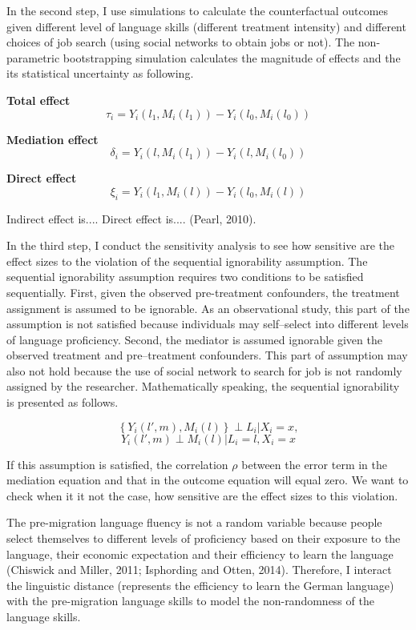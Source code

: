 \documentclass[12pt,a4paper]{article}
\begin{document}
In the second step, I use simulations to calculate the counterfactual outcomes given different level of language skills (different treatment intensity) and different choices of job search (using social networks to obtain jobs or not). The non-parametric bootstrapping simulation calculates the magnitude of effects and the its statistical uncertainty as following.

\textbf{Total effect}
$$\tau_{i} = Y_{i}(l_{1}, M_{i}(l_{1})) - Y_{i}(l_{0}, M_{i}(l_{0}))$$

\textbf{Mediation effect}
$$\delta_{i} = Y_{i}(l, M_{i}(l_{1})) - Y_{i}(l, M_{i}(l_{0}))$$

\textbf{Direct effect}
$$\xi_{i} = Y_{i}(l_{1}, M_{i}(l)) - Y_{i}(l_{0}, M_{i}(l))$$

Indirect effect is.... Direct effect is.... (Pearl, 2010).

In the third step, I conduct the sensitivity analysis to see how sensitive are the effect sizes to the violation of the sequential ignorability assumption. The sequential ignorability assumption requires two conditions to be satisfied sequentially. First, given the observed pre-treatment confounders, the treatment assignment is assumed to be ignorable. As an observational study, this part of the assumption is not satisfied because individuals may self--select into different levels of language proficiency. Second, the mediator is assumed ignorable given the observed treatment and pre--treatment confounders. This part of assumption may also not hold because the use of social network to search for job is not randomly assigned by the researcher. Mathematically speaking, the sequential ignorability is presented as follows.

$$\left \{Y_{i}(l', m), M_{i}(l)\right \} \perp L_{i}|X_{i}=x, $$
$$Y_{i}(l', m) \perp M_{i}(l)|L_{i}=l, X_{i}=x $$

If this assumption is satisfied, the correlation $\rho$ between the error term in the mediation equation and that in the outcome equation will equal zero. We want to check when it it not the case, how sensitive are the effect sizes to this violation.

The pre-migration language fluency is not a random variable because people select themselves to different levels of proficiency based on their exposure to the language, their economic expectation and their efficiency to learn the language (Chiswick and Miller, 2011; Isphording and Otten, 2014). Therefore, I interact the linguistic distance (represents the efficiency to learn the German language) with the pre-migration language skills to model the non-randomness of the language skills. 
\end{document}
